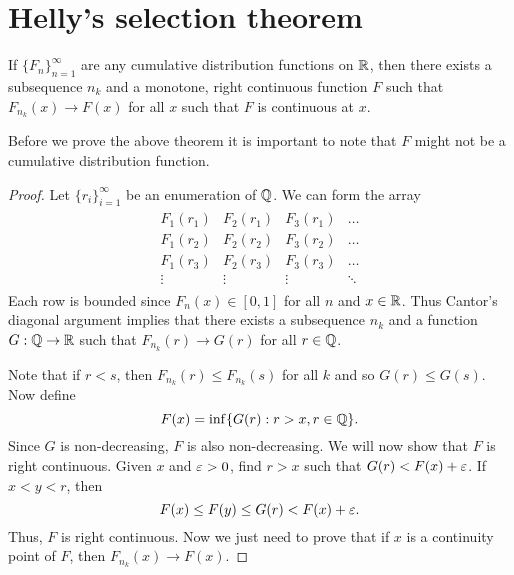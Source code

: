 \section{Helly's selection theorem}
\begin{thrm}
    If $\{F_n\}_{n=1}^\infty$ are any cumulative distribution functions on ${\mathbb R}$, then there exists a subsequence $n_k$ and a monotone, right continuous function $F$ such that $F_{n_k}(x) \to F(x)$ for all $x$ such that $F$ is continuous at $x$.
\end{thrm}
Before we prove the above theorem it is important to note that $F$ might not be a cumulative distribution function.
\begin{proof}
    Let $\{r_i\}_{i=1}^\infty$ be an enumeration of ${\mathbb{Q}}$. We can form the array
    \begin{align*}
        \begin{matrix}
            F_1(r_1)&F_2(r_1)&F_3(r_1)&\ldots\\
            F_1(r_2)&F_2(r_2)&F_3(r_2)&\ldots\\
            F_1(r_3)&F_2(r_3)&F_3(r_3)&\ldots\\
            \vdots&\vdots&\vdots&\ddots
        \end{matrix}
    \end{align*}
    Each row is bounded since $F_n(x) \in [0,1]$ for all $n$ and $x \in {\mathbb R}$. Thus Cantor's diagonal argument implies that there exists a subsequence $n_k$ and a function $G : {\mathbb{Q}} \to {\mathbb R}$ such that $F_{n_k}(r) \to G(r)$ for all $r \in {\mathbb{Q}}$.

    Note that if $r<s$, then $F_{n_k}(r) \le F_{n_k}(s)$ for all $k$ and so $G(r)\le G(s)$. Now define
    \[F(x)=\inf\{G(r): r>x, r\in {\mathbb{Q}}\}.\]
    Since $G$ is non-decreasing, $F$ is also non-decreasing. We will now show that $F$ is right continuous. Given $x$ and $\varepsilon > 0$, find $r > x$ such that $G(r) < F(x)+\varepsilon$. If $x < y < r$, then 
    \[F(x) \le F(y) \le G(r) < F(x)+\varepsilon.\]
    Thus, $F$ is right continuous. Now we just need to prove that if $x$ is a continuity point of $F$, then $F_{n_k}(x) \to F(x)$.


\end{proof}
